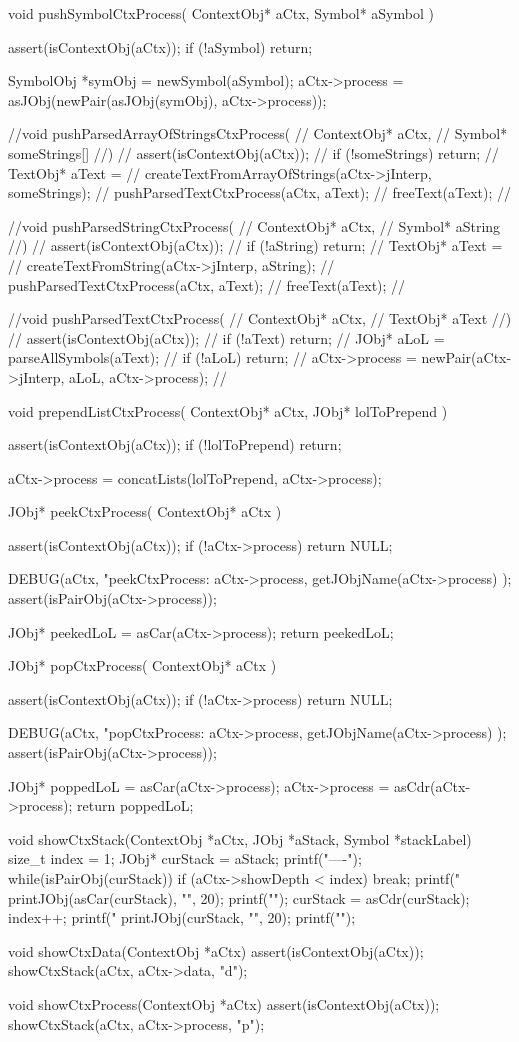 void pushSymbolCtxProcess(
  ContextObj* aCtx,
  Symbol* aSymbol
) {
  assert(isContextObj(aCtx));
  if (!aSymbol) return;

  SymbolObj *symObj = newSymbol(aSymbol);
  aCtx->process =
    asJObj(newPair(asJObj(symObj), aCtx->process));
}

//void pushParsedArrayOfStringsCtxProcess(
//  ContextObj* aCtx,
//  Symbol* someStrings[]
//) {
//  assert(isContextObj(aCtx));
//  if (!someStrings) return;
//  TextObj* aText =
//    createTextFromArrayOfStrings(aCtx->jInterp, someStrings);
//  pushParsedTextCtxProcess(aCtx, aText);
//  freeText(aText);
//}

//void pushParsedStringCtxProcess(
//  ContextObj* aCtx,
//  Symbol* aString
//) {
//  assert(isContextObj(aCtx));
//  if (!aString) return;
//  TextObj* aText =
//    createTextFromString(aCtx->jInterp, aString);
//  pushParsedTextCtxProcess(aCtx, aText);
//  freeText(aText);
//}

//void pushParsedTextCtxProcess(
//  ContextObj* aCtx,
//  TextObj* aText
//) {
//  assert(isContextObj(aCtx));
//  if (!aText) return;
//  JObj* aLoL = parseAllSymbols(aText);
//  if (!aLoL) return;
//  aCtx->process = newPair(aCtx->jInterp, aLoL, aCtx->process);
//}

void prependListCtxProcess(
  ContextObj* aCtx,
  JObj* lolToPrepend
) {
  assert(isContextObj(aCtx));
  if (!lolToPrepend) return;

  aCtx->process =
    concatLists(lolToPrepend, aCtx->process);
}

JObj* peekCtxProcess(
  ContextObj* aCtx
) {
  assert(isContextObj(aCtx));
  if (!aCtx->process) return NULL;

  DEBUG(aCtx, "peekCtxProcess: %
    aCtx->process, getJObjName(aCtx->process)
  );
  assert(isPairObj(aCtx->process));
 
  JObj* peekedLoL = asCar(aCtx->process);
  return peekedLoL;
}

JObj* popCtxProcess(
  ContextObj* aCtx
) {
  assert(isContextObj(aCtx));
  if (!aCtx->process) return NULL;

  DEBUG(aCtx, "popCtxProcess: %
    aCtx->process, getJObjName(aCtx->process)
  );
  assert(isPairObj(aCtx->process));
 
  JObj* poppedLoL = asCar(aCtx->process);
  aCtx->process   = asCdr(aCtx->process);
  return poppedLoL;
}

void showCtxStack(ContextObj *aCtx, JObj *aStack, Symbol *stackLabel) {
  size_t index = 1;
  JObj* curStack = aStack;
  printf("----\n");
  while(isPairObj(curStack)) {
    if (aCtx->showDepth < index) break;
    printf("%
    printJObj(asCar(curStack), "", 20);
    printf("\n");
    curStack = asCdr(curStack);
    index++;
  }
  printf("%
  printJObj(curStack, "", 20);
  printf("\n");
}

void showCtxData(ContextObj *aCtx) {
  assert(isContextObj(aCtx));
  showCtxStack(aCtx, aCtx->data, "d");
}

void showCtxProcess(ContextObj *aCtx) {
  assert(isContextObj(aCtx));
  showCtxStack(aCtx, aCtx->process, "p");
}

\stopCCode